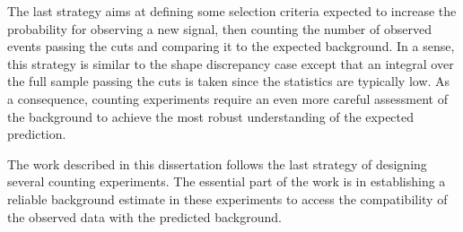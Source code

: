 The last strategy aims at defining some selection criteria expected to 
increase the probability for observing a new signal, then counting the 
number of observed events passing the cuts and comparing it to 
the expected background.
In a sense, this strategy is similar to the shape discrepancy case 
except that an integral over the  full sample 
passing the cuts is taken since the statistics are typically low.
As a consequence, counting experiments require an even more careful
assessment of the background to achieve the most robust 
understanding of the expected prediction.

The work described in this dissertation follows the last strategy 
of designing several counting experiments. The essential part of the 
work is in establishing a reliable background estimate in these 
experiments to access the compatibility of the observed data with the 
predicted background.
